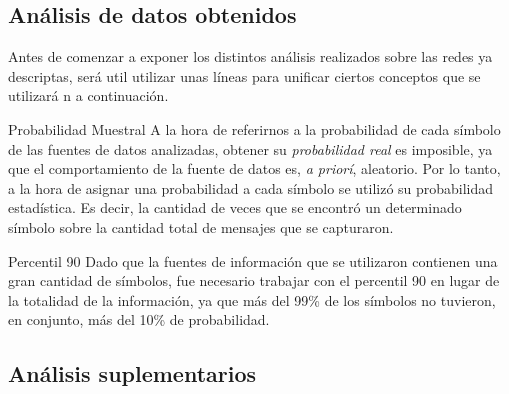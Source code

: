 \subsection{An\'alisis de datos obtenidos}
    \par Antes de comenzar a exponer los distintos an\'alisis realizados sobre las redes
    ya descriptas, ser\'a util utilizar unas l\'ineas para unificar ciertos conceptos que
    se utilizar\'a n a continuaci\'on.

    \begin{LaTeXdescription}
        \item[Probabilidad Muestral] A la hora de referirnos a la probabilidad de cada
        s\'imbolo de las fuentes de datos analizadas, obtener su \textit{probabilidad
        real} es imposible, ya que el comportamiento de la fuente de datos es, \textit{%
        a prior\'i}, aleatorio. Por lo tanto, a la hora de asignar una probabilidad a cada
        s\'imbolo se utiliz\'o su probabilidad estad\'istica. Es decir, la cantidad de
        veces que se encontr\'o un determinado s\'imbolo sobre la cantidad total de mensajes
        que se capturaron.\\

        \item[Percentil 90] Dado que la fuentes de informaci\'on que se utilizaron contienen
        una gran cantidad de s\'imbolos, fue necesario trabajar con el percentil 90 en lugar
        de la totalidad de la informaci\'on, ya que m\'as del 99\% de los s\'imbolos no
        tuvieron, en conjunto, m\'as del 10\% de probabilidad.\\

    \end{LaTeXdescription}


    

    

    

    


\subsection{An\'alisis suplementarios}\label{sec:escenario1_supl}
    

\FloatBarrier
